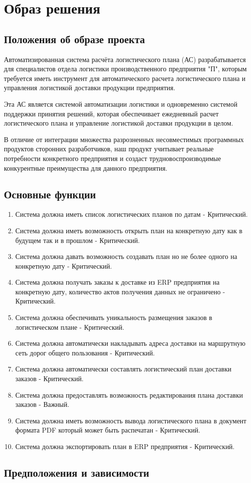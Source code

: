 \chapter{Образ решения}
\label{ch:chap2}


\section{Положения об образе проекта}
\label{sec:vision}

Автоматизированная система расчёта логистического плана (АС) разрабатывается для специалистов отдела логистики производственного предприятия "П",
которым требуется иметь инструмент для автоматического расчета логистического плана и управления логистикой доставки продукции предприятия.

Эта АС является системой автоматизации логистики и одновременно системой поддержки принятия решений,
которая обеспечивает ежедневный расчет логистического плана и управление логистикой доставки продукции в целом.

В отличие от интеграции множества разрозненных несовместимых программных продуктов сторонних разработчиков,
наш продукт учитывает реальные потребности конкретного предприятия и создаст трудновоспроизводимые конкурентные преимущества для данного предприятия.


\section{Основные функции}
\label{sec:fun}

\begin{enumerate}
    \item Система должна иметь список логистических планов по датам - Критический.
    \item Система должна иметь возможность открыть план на конкретную дату как в будущем так и в прошлом - Критический.
    \item Система должна давать возможность создавать план но не более одного на конкретную дату - Критический.
    \item Система должна получать заказы к доставке из ERP предприятия на конкретную дату, количество актов получения данных не ограничено - Критический.
    \item Система должна обеспечивать уникальность размещения заказов в логистическом плане - Критический.
    \item Система должна автоматически накладывать адреса доставки на маршрутную сеть дорог общего пользования - Критический.
    \item Система должна автоматически составлять логистический план доставки заказов - Критический.
    \item Система должна предоставлять возможность редактирования плана доставки заказов - Важный.
    \item Система должна иметь возможность вывода логистического плана в документ формата PDF который может быть распечатан - Критический.
    \item Система должна экспортировать план в ERP предприятия - Критический.
\end{enumerate}

\section{Предположения и зависимости}
\label{sec:dep}

\endinput
